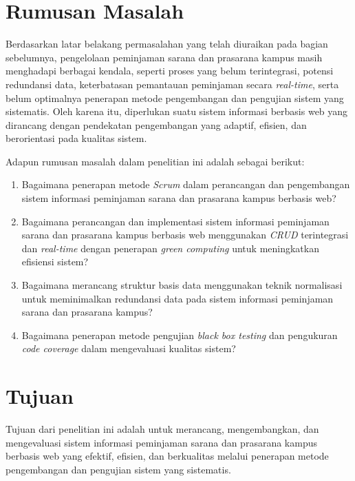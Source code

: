 \section{Rumusan Masalah}
Berdasarkan latar belakang permasalahan yang telah diuraikan pada bagian sebelumnya, pengelolaan peminjaman sarana dan prasarana kampus masih menghadapi berbagai kendala, seperti proses yang belum terintegrasi, potensi redundansi data, keterbatasan pemantauan peminjaman secara \textit{real-time}, serta belum optimalnya penerapan metode pengembangan dan pengujian sistem yang sistematis. Oleh karena itu, diperlukan suatu sistem informasi berbasis web yang dirancang dengan pendekatan pengembangan yang adaptif, efisien, dan berorientasi pada kualitas sistem.

Adapun rumusan masalah dalam penelitian ini adalah sebagai berikut:
\begin{enumerate}
    \item Bagaimana penerapan metode \textit{Scrum} dalam perancangan dan pengembangan sistem informasi peminjaman sarana dan prasarana kampus berbasis web?
    \item Bagaimana perancangan dan implementasi sistem informasi peminjaman sarana dan prasarana kampus berbasis web menggunakan \textit{CRUD} terintegrasi dan \textit{real-time} dengan penerapan \textit{green computing} untuk meningkatkan efisiensi sistem?
    

    \item Bagaimana merancang struktur basis data menggunakan teknik normalisasi untuk meminimalkan redundansi data pada sistem informasi peminjaman sarana dan prasarana kampus?
    \item Bagaimana penerapan metode pengujian \textit{black box testing} dan pengukuran \textit{code coverage} dalam mengevaluasi kualitas sistem?
\end{enumerate}

\section{Tujuan}
Tujuan dari penelitian ini adalah untuk merancang, mengembangkan, dan mengevaluasi sistem informasi peminjaman sarana dan prasarana kampus berbasis web yang efektif, efisien, dan berkualitas melalui penerapan metode pengembangan dan pengujian sistem yang sistematis.

